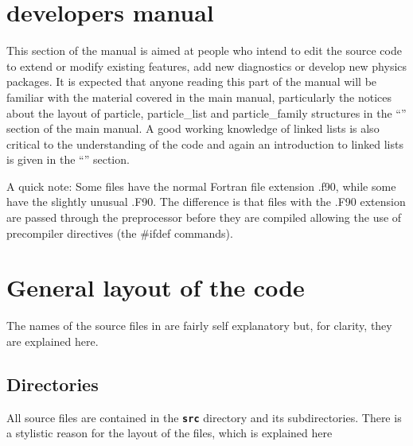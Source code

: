 \documentclass[12pt,a4paper]{article}
\newcommand{\inlinecode}[1]{{\color{warwickred} \bf\texttt{#1}}}
\newcommand{\EPOCH}{{\color{warwickdark}\fontfamily{phv}\selectfont{EPOCH}}}
\begin{document}
{
  \selectfont
}

\section{{\EPOCH} developers manual}

This section of the manual is aimed at people who intend to edit the {\EPOCH}
source code to extend or modify existing features, add new diagnostics or
develop new physics packages. It is expected that anyone reading this part of
the manual will be familiar with the material covered in the main manual,
particularly the notices about the layout of particle, particle\_list and
particle\_family structures in the ``'' section
of the main manual. A good working knowledge of linked lists is also critical to
the understanding of the code and again an introduction to linked lists is
given in the ``'' section.

A quick note: Some files have the normal Fortran file extension .f90, while
some have the slightly unusual .F90. The difference is that files with the
.F90 extension are passed through the preprocessor before they are compiled
allowing the use of precompiler directives (the \#ifdef commands).

\section{General layout of the {\EPOCH} code}

The names of the source files in {\EPOCH} are fairly self explanatory but, for
clarity, they are explained here.

\subsection{Directories}
All source files are contained in the \inlinecode{src} directory and its
subdirectories. There is a stylistic reason for the layout of the files, which
is explained here
\end{document}
